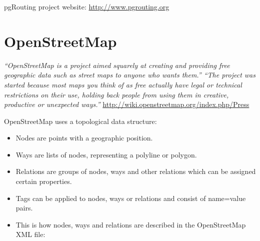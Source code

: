 \documentclass[a4paper,10pt,english]{manual}
\begin{document}
pgRouting project website: \href{http://www.pgrouting.org}{http://www.pgrouting.org}


\section{OpenStreetMap}

\emph{``OpenStreetMap is a project aimed squarely at creating and providing free geographic data such as street maps to anyone who wants them.'' ``The project was started because most maps you think of as free actually have legal or technical restrictions on their use, holding back people from using them in creative, productive or unexpected ways.''} \href{http://wiki.openstreetmap.org/index.php/Press}{http://wiki.openstreetmap.org/index.php/Press}

OpenStreetMap uses a topological data structure:
\begin{itemize}
\item {} 
Nodes are points with a geographic position.

\item {} 
Ways are lists of nodes, representing a polyline or polygon.

\item {} 
Relations are groups of nodes, ways and other relations which can be assigned certain properties.

\item {} 
Tags can be applied to nodes, ways or relations and consist of name=value pairs.

\item {} 
This is how nodes, ways and relations are described in the OpenStreetMap XML file:

\end{itemize}
\end{document}

